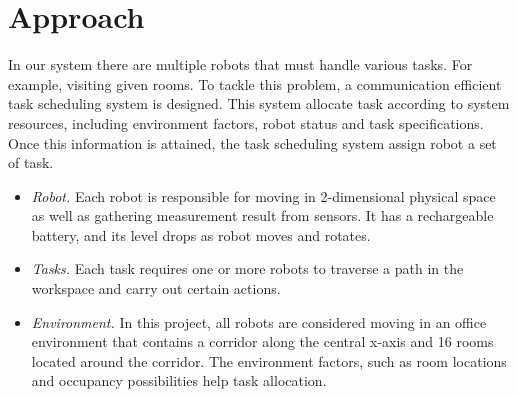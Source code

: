 \chapter{Approach}


In our system there are multiple robots that must handle various tasks. For example, visiting given rooms. To tackle this problem, a communication efficient task scheduling system is designed. 
This system allocate task according to system resources, including environment factors, robot status and task specifications. Once this information is attained, the task scheduling system assign robot a set of task.

\begin{itemize}
	\item \textsl{Robot.} Each robot is responsible for moving in 2-dimensional physical space as well as gathering measurement result from sensors. It has a rechargeable battery, and its level drops as robot moves and rotates.
	\item \textsl{Tasks.} Each task requires one or more robots to traverse a path in the workspace and carry out certain actions\cite{Ivan2017}.
	\item \textsl{Environment.} In this project, all robots are considered moving in an office environment that contains a corridor along the central x-axis and 16 rooms located around the corridor. The environment factors, such as room locations and occupancy possibilities help task allocation.
\end{itemize}

